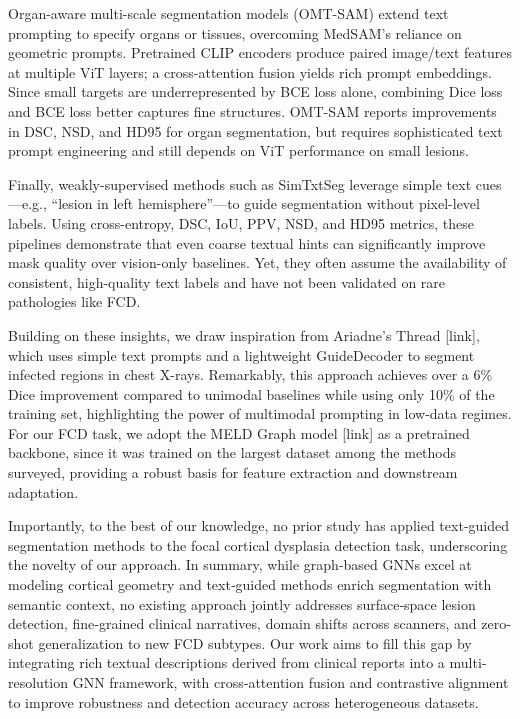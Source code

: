 \documentclass[FCD_GNN.tex]{subfiles}
\begin{document}
Organ-aware multi-scale segmentation models (OMT-SAM) extend text prompting to specify organs or tissues, overcoming MedSAM’s reliance on geometric 
prompts. Pretrained CLIP encoders produce paired image/text features at multiple ViT layers; a cross-attention fusion yields rich prompt embeddings. 
Since small targets are underrepresented by BCE loss alone, combining Dice loss and BCE loss better captures fine structures. OMT-SAM reports 
improvements in DSC, NSD, and HD95 for organ segmentation, but requires sophisticated text prompt engineering and still depends on ViT performance on 
small lesions.

Finally, weakly-supervised methods such as SimTxtSeg leverage simple text cues—e.g., “lesion in left hemisphere”—to guide segmentation without 
pixel-level labels. Using cross-entropy, DSC, IoU, PPV, NSD, and HD95 metrics, these pipelines demonstrate that even coarse textual hints can 
significantly improve mask quality over vision-only baselines. Yet, they often assume the availability of consistent, high-quality text labels and 
have not been validated on rare pathologies like FCD.

Building on these insights, we draw inspiration from Ariadne’s Thread [link], which uses simple text prompts and a lightweight GuideDecoder to segment 
infected regions in chest X-rays. Remarkably, this approach achieves over a 6\% Dice improvement compared to unimodal baselines while using 
only 10\% of the training set, highlighting the power of multimodal prompting in low-data regimes. For our FCD task, we adopt the MELD Graph model [link] 
as a pretrained backbone, since it was trained on the largest dataset among the methods surveyed, providing a robust basis for feature extraction and 
downstream adaptation.

Importantly, to the best of our knowledge, no prior study has applied text‐guided segmentation methods to the focal cortical dysplasia detection task, 
underscoring the novelty of our approach. In summary, while graph‐based GNNs excel at modeling cortical geometry and text‐guided methods enrich 
segmentation with semantic context, no existing approach jointly addresses surface‐space lesion detection, fine‐grained clinical narratives, domain 
shifts across scanners, and zero‐shot generalization to new FCD subtypes. Our work aims to fill this gap by integrating rich textual descriptions 
derived from clinical reports into a multi‐resolution GNN framework, with cross‐attention fusion and contrastive alignment to improve robustness and 
detection accuracy across heterogeneous datasets.
\end{document}
